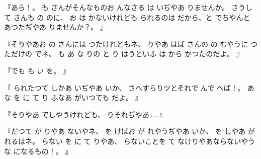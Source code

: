 『あら！。
も
さんがそんなものお
んなさる
は
いぢやあ
りませんか。
さうして
さんも
の
のに、
お
は
かないけれども
られるのは
だから、と
でちやんと
あつたぢやあ
りませんか？。
』

『そりやあお
の
さんには
つたけれどもネ、
りやあ
はば
さんの
の
むやうに
つただけの
でネ、
も
あ
な
りの
と
り
はうといふ
は
から
かつたのだよ。
』

『でも
も
い
を。
』

『
られたつて
しかあ
いぢやあ
いか、
さへすらりツとそれで
んで
へば！。
あ
な
を
に
て
り
ふなあ
がいつても
だよ。
』

『そりやあ
でしやうけれども、
りそれぢやあ……』

『だつて
が
りやあ
ないやネ、
を
けばお
が
れやうぢやあ
いか、
を
しやあ
が
れるはネ。
らない
を
に
て
りやあ、
らないことを
て
なけりやあならないやうな
になるもの！。
』

